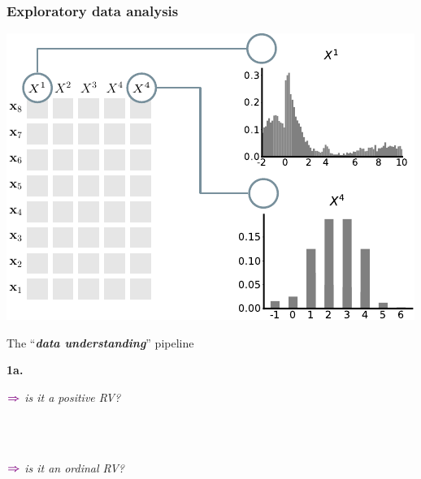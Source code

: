 \documentclass[xcolor={usenames,dvipsnames,svgnames}, compress, aspectratio=169, 11pt]{beamer}
\newcommand{\comment}[3][\small]{\begin{minipage}{1\linewidth}
          \raggedleft
          {
            $\color{violet}\boldsymbol\Rightarrow$
            #1
            {\emph{#2}}
          }
      \end{minipage}#3\\
}
\begin{document}
\begin{frame}[t, htt=bgrey2]
  \frametitle{Exploratory data analysis}

  \large
  \begin{minipage}[t]{0.6\linewidth}
    \vspace{5pt}
    \includegraphics[width=.9\linewidth]{figures/abda-hist-type}
  \end{minipage}\hfill\begin{minipage}[t]{0.4\linewidth}
    \vspace{10pt}
    {The ``\emph{\textbf{data understanding}}'' pipeline}\\[3pt]
    \raggedleft\begin{minipage}[t]{.9\linewidth}
      {\textbf{1a.} \\[5pt]}
    {\comment[\normalsize]{is it a positive RV?}{}\\[-17pt]
      \comment[\normalsize]{is it an ordinal RV?}{}\\}
    \end{minipage}    
  \end{minipage}  
\end{frame}
\end{document}
